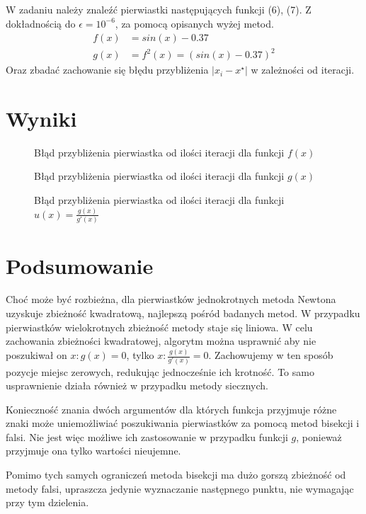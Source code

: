 \documentclass[11pt]{extarticle}
\begin{document}
	\subsection{}
	W zadaniu należy znaleźć pierwiastki następujących funkcji (6), (7). Z dokładnością do \(\epsilon=10^{-6}\), za pomocą opisanych wyżej metod.
	\begin{align}
		f(x) &= sin(x) - 0.37 \\
		g(x) &= f^2(x) = (sin(x) - 0.37)^2
	\end{align}
	Oraz zbadać zachowanie się błędu przybliżenia \(|x_i - x^\star|\) w zależności od iteracji.

	\section{Wyniki}

	\begin{figure}[H]
		\begin{center}
			
		\end{center}
		\caption{Błąd przybliżenia pierwiastka od ilości iteracji dla funkcji \(f(x)\)}
		\label{ch1}
	\end{figure}
	\begin{figure}[H]
		\begin{center}
			
		\end{center}
		\caption{Błąd przybliżenia pierwiastka od ilości iteracji dla funkcji \(g(x)\)}
		\label{ch2}
	\end{figure}
	\begin{figure}[H]
		\begin{center}
			
		\end{center}
		\caption{Błąd przybliżenia pierwiastka od ilości iteracji dla funkcji \(u(x) = \frac{g(x)}{g'(x)}\)}
		\label{ch3}
	\end{figure}


	\section{Podsumowanie}
	Choć może być rozbieżna, dla pierwiastków jednokrotnych metoda Newtona uzyskuje zbieżność kwadratową, najlepszą pośród badanych metod.
	W przypadku pierwiastków wielokrotnych zbieżność metody staje się liniowa.
	W celu zachowania zbieżności kwadratowej, algorytm można usprawnić aby nie poszukiwał on \(x:g(x)=0\), tylko \(x:\frac{g(x)}{g'(x)}=0\).
	Zachowujemy w ten sposób pozycje miejsc zerowych, redukując jednocześnie ich krotność.
	To samo usprawnienie działa również w przypadku metody siecznych.

	Konieczność znania dwóch argumentów dla których funkcja przyjmuje różne znaki może uniemożliwiać poszukiwania pierwiastków za pomocą metod bisekcji i falsi.
	Nie jest więc możliwe ich zastosowanie w przypadku funkcji \(g\), ponieważ przyjmuje ona tylko wartości nieujemne.

	Pomimo tych samych ograniczeń metoda bisekcji ma dużo gorszą zbieżność od metody falsi, upraszcza jedynie wyznaczanie następnego punktu, nie wymagając przy tym dzielenia.
\end{document}
